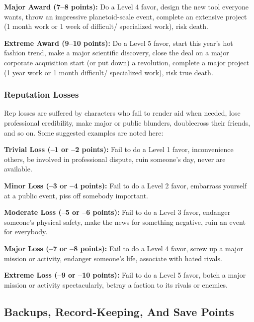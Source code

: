 \textbf{Major Award (7–8 points):} Do a Level 4 favor, design the new tool everyone wants, throw an impressive planetoid-scale event, complete an extensive project (1 month work or 1 week of difficult/ specialized work), risk death. 

\textbf{Extreme Award (9–10 points):} Do a Level 5 favor, start this year's hot fashion trend, make a major scientific discovery, close the deal on a major corporate acquisition start (or put down) a revolution, complete a major project (1 year work or 1 month difficult/ specialized work), risk true death. 

\subsubsection{Reputation Losses} 

Rep losses are suffered by characters who fail to render aid when needed, lose professional credibility, make major or public blunders, doublecross their friends, and so on. Some suggested examples are noted here: 

\textbf{Trivial Loss (–1 or –2 points):} Fail to do a Level 1 favor, inconvenience others, be involved in professional dispute, ruin someone's day, never are available. 

\textbf{Minor Loss (–3 or –4 points):} Fail to do a Level 2 favor, embarrass yourself at a public event, piss off somebody important. 

\textbf{Moderate Loss (–5 or –6 points):} Fail to do a Level 3 favor, endanger someone's physical safety, make the news for something negative, ruin an event for everybody. 

\textbf{Major Loss (–7 or –8 points):} Fail to do a Level 4 favor, screw up a major mission or activity, endanger someone's life, associate with hated rivals. 

\textbf{Extreme Loss (–9 or –10 points):} Fail to do a Level 5 favor, botch a major mission or activity spectacularly, betray a faction to its rivals or enemies. 

\subsection{Backups, Record-Keeping, And Save Points} 

